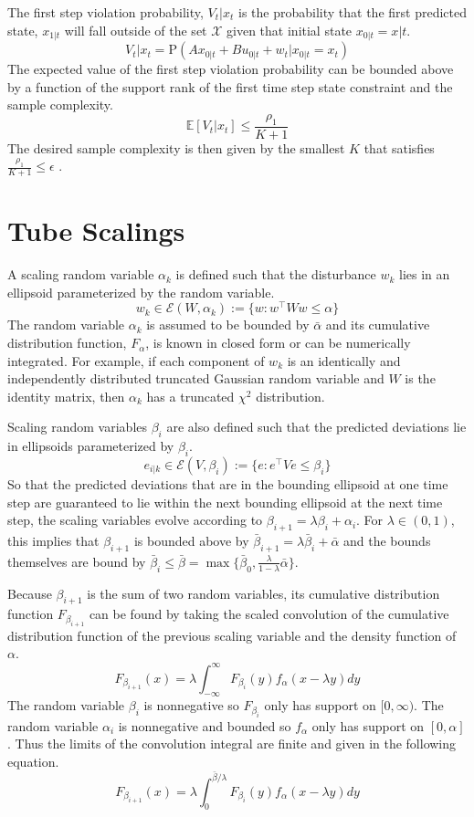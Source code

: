 \documentclass[12 pt]{report}
\begin{document}
The first step violation probability, $V_t|x_t$ is the probability that the first predicted state, $x_{1|t}$ will fall outside of the set $\mathcal{X}$ given that initial state $x_{0|t} = x|t$. $$V_t|x_t = \mathrm{P}\left( Ax_{0|t} + Bu_{0|t} + w_{t} | x_{0|t} = x_t \right) $$
The expected value of the first step violation probability can be bounded above by a function of the support rank of the first time step state constraint and the sample complexity. $$ \mathbb{E} \left[ V_t|x_t \right] \leq \frac{\rho_1}{K+1} $$
The desired sample complexity is then given by the smallest $K$ that satisfies $ \frac{\rho_1}{K+1} \leq \epsilon $ \cite{schildbach14}.

\section{Tube Scalings}

A scaling random variable $\alpha_k$ is defined such that the disturbance $w_k$ lies in an ellipsoid parameterized by the random variable. $$w_k \in \mathcal{E}(W, \alpha_k) := \{w: w^\top Ww \leq \alpha\}$$ The random variable $\alpha_k$ is assumed to be bounded by $\bar{\alpha}$ and its cumulative distribution function, $F_\alpha$, is known in closed form or can be numerically integrated. For example, if each component of $w_k$ is an identically and independently distributed truncated Gaussian random variable and $W$ is the identity matrix, then $\alpha_k$ has a truncated $\chi^2$ distribution. 

Scaling random variables $\beta_i$ are also defined such that the predicted deviations lie in ellipsoids parameterized by $\beta_i$. $$ e_{i|k} \in \mathcal{E}(V, \beta_i) := \{e : e^\top Ve \leq \beta_i\}  $$ So that the predicted deviations that are in the bounding ellipsoid at one time step are guaranteed to lie within the next bounding ellipsoid at the next time step, the scaling variables evolve according to $ \beta_{i+1} = \lambda \beta_i + \alpha_i $. For $\lambda \in (0,1)$, this implies that $\beta_{i+1}$ is bounded above by $\bar{\beta}_{i+1} = \lambda\bar{\beta}_i + \bar{\alpha} $ and the bounds themselves are bound by $\bar{\beta}_i \leq \bar{\beta} = \max \{ \bar{\beta}_0, \frac{\lambda}{1 - \lambda} \bar{\alpha}\}$. 

Because $\beta_{i+1}$ is the sum of two random variables, its cumulative distribution function $F_{\beta_{i+1}}$ can be found by taking the scaled convolution of the cumulative distribution function of the previous scaling variable and the density function of $\alpha$. $$ F_{\beta_{i+1}}(x) = \lambda \int_{-\infty}^{\infty} F_{\beta_i}(y)f_\alpha (x-\lambda y)dy $$ The random variable $\beta_i$ is nonnegative so $F_{\beta_i}$ only has support on $[0, \infty)$. The random variable $\alpha_i$ is nonnegative and bounded so $f_\alpha$ only has support on $[0, \alpha]$. Thus the limits of the convolution integral are finite and given in the following equation. $$ F_{\beta_{i+1}}(x) = \lambda \int_{0}^{\bar{\beta}/\lambda} F_{\beta_i}(y)f_\alpha (x-\lambda y)dy $$
\end{document}
